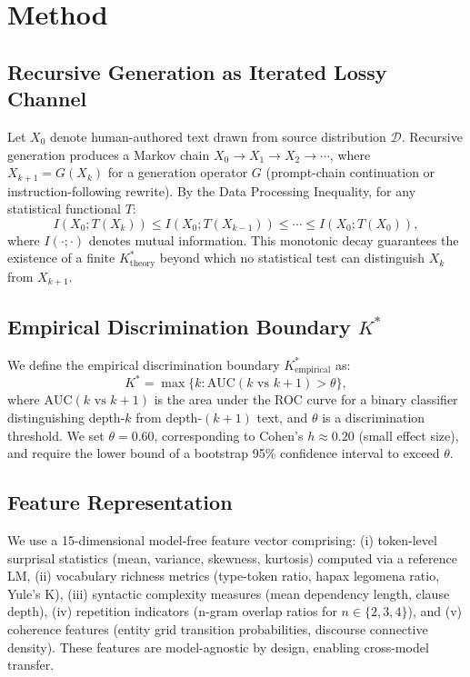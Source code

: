 \documentclass[11pt,a4paper]{article}
\begin{document}
\section{Method}

\subsection{Recursive Generation as Iterated Lossy Channel}

Let $X_0$ denote human-authored text drawn from source distribution $\mathcal{D}$.
Recursive generation produces a Markov chain $X_0 \to X_1 \to X_2 \to \cdots$, where $X_{k+1} = G(X_k)$ for a generation operator $G$ (prompt-chain continuation or instruction-following rewrite).
By the Data Processing Inequality, for any statistical functional $T$:
\begin{equation}
    I(X_0; T(X_k)) \leq I(X_0; T(X_{k-1})) \leq \cdots \leq I(X_0; T(X_0)),
\end{equation}
where $I(\cdot;\cdot)$ denotes mutual information. This monotonic decay guarantees the existence of a finite $K^*_{\text{theory}}$ beyond which no statistical test can distinguish $X_k$ from $X_{k+1}$.

\subsection{Empirical Discrimination Boundary $K^*$}

We define the empirical discrimination boundary $K^*_{\text{empirical}}$ as:
\begin{equation}
    K^* = \max\{k : \text{AUC}(k \text{ vs } k{+}1) > \theta\},
\end{equation}
where $\text{AUC}(k \text{ vs } k{+}1)$ is the area under the ROC curve for a binary classifier distinguishing depth-$k$ from depth-$(k{+}1)$ text, and $\theta$ is a discrimination threshold.
We set $\theta = 0.60$, corresponding to Cohen's $h \approx 0.20$ (small effect size), and require the lower bound of a bootstrap 95\% confidence interval to exceed $\theta$.

\subsection{Feature Representation}

We use a 15-dimensional model-free feature vector comprising:
(i) token-level surprisal statistics (mean, variance, skewness, kurtosis) computed via a reference LM,
(ii) vocabulary richness metrics (type-token ratio, hapax legomena ratio, Yule's K),
(iii) syntactic complexity measures (mean dependency length, clause depth),
(iv) repetition indicators (n-gram overlap ratios for $n \in \{2,3,4\}$),
and (v) coherence features (entity grid transition probabilities, discourse connective density).
These features are model-agnostic by design, enabling cross-model transfer.
\end{document}
